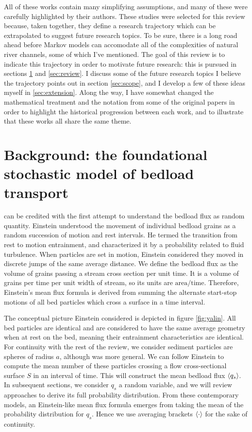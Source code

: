 All of these works contain many simplifying assumptions, and many of these were carefully highlighted by their authors. 
These studies were selected for this review because, taken together, they define a research trajectory which can be extrapolated to suggest future research topics. 
To be sure, there is a long road ahead before Markov models can accomodate all of the complexities of natural river channels, some of which I've mentioned. 
The goal of this review is to indicate this trajectory in order to motivate future research: this is pursued in sections \ref{sec:background} and \ref{sec:review}. 
I discuss some of the future research topics I believe the trajectory points out in section \ref{sec:scope}, and I develop a few of these ideas myself in \ref{sec:extension}. 
Along the way, I have somewhat changed the mathematical treatment and the notation from some of the original papers in order to highlight the historical progression between each work, and to illustrate that these works all share the same theme.  




\section{Background: the foundational stochastic model of bedload transport} 
\label{sec:background}

\citet{Einstein1950} can be credited with the first attempt to understand the bedload flux as random quantity.  
Einstein understood the movement of individual bedload grains as a random succession of motion and rest intervals.
He termed the transition from rest to motion entrainment, and characterized it by a probability related to fluid turbulence. 
When particles are set in motion, Einstein considered they moved in discrete jumps of the same average distance. 
We define the bedload flux as the volume of grains passing a stream cross section per unit time.
It is a volume of grains per time per unit width of stream, so its units are $\text{area}/\text{time}$.  
Therefore, Einstein's mean flux formula is derived from summing the alternate start-stop motions of all bed particles which cross a surface in a time interval. 

The conceptual picture Einstein considered is depicted in figure \ref{fig:yalin}. 
All bed particles are identical and are considered to have the same average geometry when at rest on the bed, meaning their entrainment characteristics are identical. 
For continuity with the rest of the review, we consider sediment particles are spheres of radius $a$, although \citet{Einstein1950} was more general. 
We can follow Einstein to compute the mean number of these particles crossing a flow cross-sectional surface $S$ in an interval of time. 
This will construct the mean bedload flux $\langle q_s \rangle$.
In subsequent sections, we consider $q_s$ a random variable, and we will review approaches to derive its full probability distribution.
From these contemporary models, an Einstein-like mean flux formula emerges from taking the mean of the probability distribution for $q_s$.  
Hence we use averaging brackets $\langle \cdot \rangle$ for the sake of continuity. 

